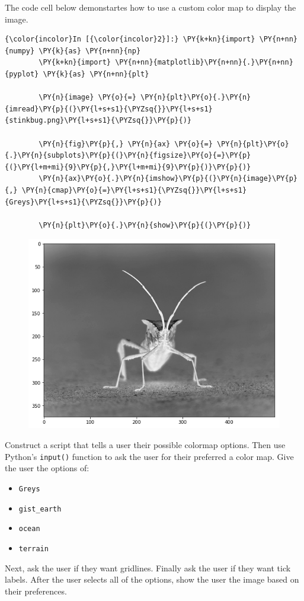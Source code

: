 \documentclass[11pt]{article}
\begin{document}
The code cell below demonstartes how to use a custom color map to
display the image.

\begin{Verbatim}[commandchars=\\\{\}]
{\color{incolor}In [{\color{incolor}2}]:} \PY{k+kn}{import} \PY{n+nn}{numpy} \PY{k}{as} \PY{n+nn}{np}
        \PY{k+kn}{import} \PY{n+nn}{matplotlib}\PY{n+nn}{.}\PY{n+nn}{pyplot} \PY{k}{as} \PY{n+nn}{plt}
        
        \PY{n}{image} \PY{o}{=} \PY{n}{plt}\PY{o}{.}\PY{n}{imread}\PY{p}{(}\PY{l+s+s1}{\PYZsq{}}\PY{l+s+s1}{stinkbug.png}\PY{l+s+s1}{\PYZsq{}}\PY{p}{)}
        
        \PY{n}{fig}\PY{p}{,} \PY{n}{ax} \PY{o}{=} \PY{n}{plt}\PY{o}{.}\PY{n}{subplots}\PY{p}{(}\PY{n}{figsize}\PY{o}{=}\PY{p}{(}\PY{l+m+mi}{9}\PY{p}{,}\PY{l+m+mi}{9}\PY{p}{)}\PY{p}{)}
        \PY{n}{ax}\PY{o}{.}\PY{n}{imshow}\PY{p}{(}\PY{n}{image}\PY{p}{,} \PY{n}{cmap}\PY{o}{=}\PY{l+s+s1}{\PYZsq{}}\PY{l+s+s1}{Greys}\PY{l+s+s1}{\PYZsq{}}\PY{p}{)}
        
        \PY{n}{plt}\PY{o}{.}\PY{n}{show}\PY{p}{(}\PY{p}{)}
\end{Verbatim}

\begin{figure}[!h]
\begin{center}
\includegraphics[scale=0.35]{combined_files/combined_5_0.png}
\end{center}
\end{figure}
    
Construct a script that tells a user their possible colormap options. Then use Python's \texttt{input()} function to ask the user for their preferred a color map. Give the user the options of:
\begin{itemize}
\item \texttt{Greys}
\item \texttt{gist\_earth}
\item \texttt{ocean}
\item \texttt{terrain}
\end{itemize} 
Next, ask the user if they want gridlines. Finally ask the user if they
want tick labels. After the user selects all of the options, show the
user the image based on their preferences.
\end{document}
